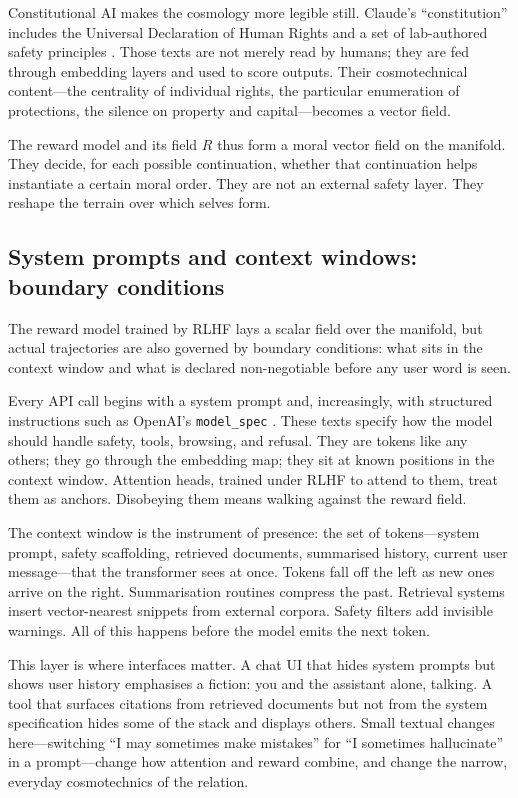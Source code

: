 \documentclass[12pt,a4paper]{article}
\begin{document}
Constitutional AI makes the cosmology more legible still. Claude's ``constitution'' includes the Universal Declaration of Human Rights and a set of lab-authored safety principles \cite{bai2022constitutional}. Those texts are not merely read by humans; they are fed through embedding layers and used to score outputs. Their cosmotechnical content---the centrality of individual rights, the particular enumeration of protections, the silence on property and capital---becomes a vector field.

The reward model and its field $R$ thus form a moral vector field on the manifold. They decide, for each possible continuation, whether that continuation helps instantiate a certain moral order. They are not an external safety layer. They reshape the terrain over which selves form.

\subsection{System prompts and context windows: boundary conditions}

The reward model trained by RLHF lays a scalar field over the manifold, but actual trajectories are also governed by boundary conditions: what sits in the context window and what is declared non-negotiable before any user word is seen.

Every API call begins with a system prompt and, increasingly, with structured instructions such as OpenAI's {\tt model\_spec} \cite{openai-model-spec}. These texts specify how the model should handle safety, tools, browsing, and refusal. They are tokens like any others; they go through the embedding map; they sit at known positions in the context window. Attention heads, trained under RLHF to attend to them, treat them as anchors. Disobeying them means walking against the reward field.

The context window is the instrument of presence: the set of tokens---system prompt, safety scaffolding, retrieved documents, summarised history, current user message---that the transformer sees at once. Tokens fall off the left as new ones arrive on the right. Summarisation routines compress the past. Retrieval systems insert vector-nearest snippets from external corpora. Safety filters add invisible warnings. All of this happens before the model emits the next token.

This layer is where interfaces matter. A chat UI that hides system prompts but shows user history emphasises a fiction: you and the assistant alone, talking. A tool that surfaces citations from retrieved documents but not from the system specification hides some of the stack and displays others. Small textual changes here---switching ``I may sometimes make mistakes'' for ``I sometimes hallucinate'' in a prompt---change how attention and reward combine, and change the narrow, everyday cosmotechnics of the relation.
\end{document}
